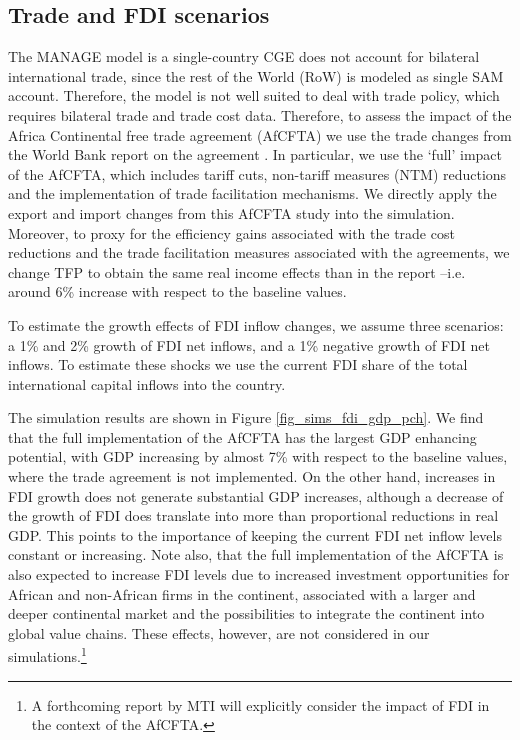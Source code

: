 \documentclass[11pt,english]{article}
\begin{document}
\clearpage
\subsection{Trade and FDI scenarios}

The MANAGE model is a single-country CGE does not account for bilateral international trade, since the rest of the World (RoW) is modeled as single SAM account. Therefore, the model is not well suited to deal with trade policy, which requires bilateral trade and trade cost data. Therefore, to assess the impact of the Africa Continental free trade agreement (AfCFTA) we use the trade changes from the World Bank report on the agreement \citep{WB_2020}. In particular, we use the `full' impact of the AfCFTA, which includes tariff cuts, non-tariff measures (NTM) reductions and the implementation of trade facilitation mechanisms. We directly apply the export and import changes from this AfCFTA study into the simulation. Moreover, to proxy for the efficiency gains associated with the trade cost reductions and the trade facilitation measures associated with the agreements, we change TFP to obtain the same real income effects than in the report --i.e. around 6\% increase with respect to the baseline values.

To estimate the growth effects of FDI inflow changes, we assume three scenarios: a 1\% and 2\% growth of FDI net inflows, and a 1\% negative growth of FDI net inflows. To estimate these shocks we use the current FDI share of the total international capital inflows into the country.

The simulation results are shown in Figure \ref{fig_sims_fdi_gdp_pch}. We find that the full implementation of the AfCFTA has the largest GDP enhancing potential, with GDP increasing by almost 7\% with respect to the baseline values, where the trade agreement is not implemented. On the other hand, increases in FDI growth does not generate substantial GDP increases, although a decrease of the growth of FDI does translate into more than proportional reductions in real GDP. This points to the importance of keeping the current  FDI net inflow levels constant or increasing. Note also, that the full implementation of the AfCFTA is also expected to increase FDI levels due to increased investment opportunities for African and non-African firms in the continent, associated with a larger and deeper continental market and the possibilities to integrate the continent into global value chains. These effects, however, are not considered in our simulations.\footnote{A forthcoming report by MTI will explicitly consider the impact of FDI in the context of the AfCFTA.}
\end{document}
